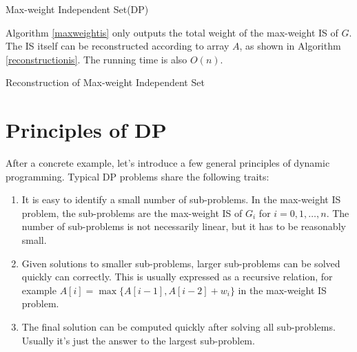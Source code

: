\begin{algorithm}[ht]
\caption{Max-weight Independent Set(DP)}\label{maxweightis}
\begin{algorithmic}[1]
\EndFor
\end{algorithmic}
\end{algorithm}

Algorithm \ref{maxweightis} only outputs the total weight of the max-weight IS of $G$. The IS itself can be reconstructed according to array $A$, as shown in Algorithm \ref{reconstructionis}. The running time is also $O(n)$.

\begin{algorithm}[ht]
\caption{Reconstruction of Max-weight Independent Set}\label{reconstructionis}
\begin{algorithmic}[1]
\Else
{}
\EndIf
\EndWhile
{}
\EndIf
\end{algorithmic}
\end{algorithm}
\section{Principles of DP}
After a concrete example, let's introduce a few general principles of dynamic programming. Typical DP problems  share the following traits:
\begin{enumerate}
\item It is easy to identify a small number of sub-problems. In the max-weight IS problem, the sub-problems are the max-weight IS of $G_i$ for $i=0,1,\dots,n$. The number of sub-problems is not necessarily linear, but it has to be reasonably small.
\item Given solutions to smaller sub-problems, larger sub-problems can be solved quickly can correctly. This is usually expressed as a recursive relation, for example $A[i]=\max\{A[i-1],A[i-2]+w_i\}$ in the max-weight IS problem.
\item The final solution can be computed quickly after solving all sub-problems. Usually it's just the answer to the largest sub-problem.
\end{enumerate}
